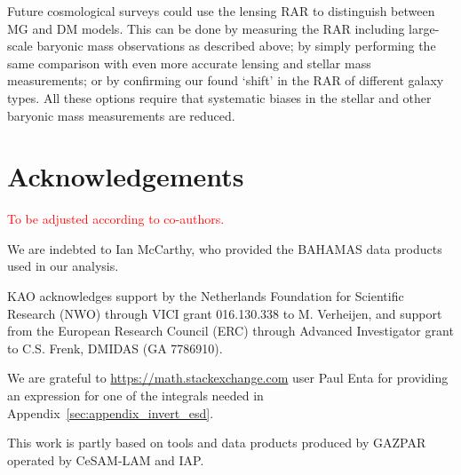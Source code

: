 \documentclass[usenatbib]{mnras}
\newcommand{\un}[1]{_{\rm #1}}
\begin{document}
Future cosmological surveys could use the lensing RAR to distinguish between MG and DM models. This can be done by measuring the RAR including large-scale baryonic mass observations as described above; by simply performing the same comparison with even more accurate lensing and stellar mass measurements; or by confirming our found `shift' in the RAR of different galaxy types. All these options require that systematic biases in the stellar and other baryonic mass measurements are reduced.




\section*{Acknowledgements}
\textcolor{red}{To be adjusted according to co-authors.}

We are indebted to Ian McCarthy, who provided the BAHAMAS data products used in our analysis.

KAO acknowledges support by the Netherlands Foundation for Scientific Research (NWO) through VICI grant 016.130.338 to M. Verheijen, and support from the European Research Council (ERC) through Advanced Investigator grant to C.S. Frenk, DMIDAS (GA 7786910).

We are grateful to \url{https://math.stackexchange.com} user Paul Enta for providing an expression for one of the integrals needed in Appendix~\ref{sec:appendix_invert_esd}.

This work is partly based on tools and data products produced by GAZPAR operated by CeSAM-LAM and IAP.

\end{document}
